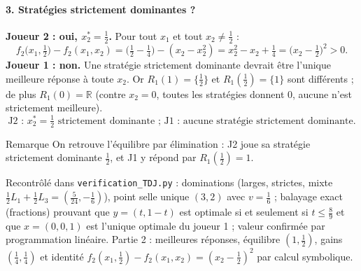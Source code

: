 \documentclass[11pt,a4paper]{article}
\begin{document}
\paragraph{3. Stratégies strictement dominantes ?}
\textbf{Joueur 2 : oui, $x_2^*=\frac12$.} Pour tout $x_1$ et tout $x_2\ne\frac12$ :
\[
f_2\big(x_1,\tfrac12\big)-f_2(x_1,x_2)=\big(\tfrac12-\tfrac14\big)-(x_2-x_2^2)=x_2^2-x_2+\tfrac14=\big(x_2-\tfrac12\big)^2>0.
\]
\textbf{Joueur 1 : non.} Une stratégie strictement dominante devrait être l'unique meilleure réponse à toute $x_2$. Or $R_1(1)=\{\frac12\}$ et $R_1(\frac12)=\{1\}$ sont différents ; de plus $R_1(0)=\mathbb{R}$ (contre $x_2=0$, toutes les stratégies donnent $0$, aucune n'est strictement meilleure).
\[
\boxed{\text{J2 : } x_2^*=\tfrac12 \text{ strictement dominante ; J1 : aucune stratégie strictement dominante.}}
\]
\begin{rembox}{Remarque}
On retrouve l'équilibre par élimination : J2 joue sa stratégie strictement dominante $\frac12$, et J1 y répond par $R_1(\frac12)=1$.
\end{rembox}

\vspace{0.4cm}
\begin{verifbox}
Recontrôlé dans \texttt{verification\_TDJ.py} : dominations (larges, strictes, mixte $\frac12L_1+\frac12L_3=(\frac5{24},-\frac16)$), point selle unique $(3,2)$ avec $v=\frac16$ ; balayage exact (fractions) prouvant que $y=(t,1-t)$ est optimale si et seulement si $t\le\frac89$ et que $x=(0,0,1)$ est l'unique optimale du joueur 1 ; valeur confirmée par programmation linéaire. Partie 2 : meilleures réponses, équilibre $(1,\frac12)$, gains $(\frac14,\frac14)$ et identité $f_2(x_1,\frac12)-f_2(x_1,x_2)=(x_2-\frac12)^2$ par calcul symbolique.
\end{verifbox}
\end{document}
